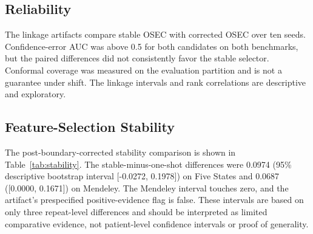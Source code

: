 \documentclass[12pt]{article}
\begin{document}
\begin{table}[t]
\centering
\caption{Mendeley nested-validation sensitivity after excluding the potentially
post-diagnostic fluoroscopy-derived predictor. Entries are fold-mean ROC-AUC
$\pm$ fold standard deviation across the same three outer folds; they are
descriptive, not patient-level confidence intervals.}
\label{tab:mendeley-validity-sensitivity}

\end{table}

\begin{table}[t]
\centering
\caption{Post-hoc AngioCAD sensitivity to the undocumented FBS unit. Predictive
bootstrap intervals condition on the 79 negative and 298 positive matched
records. OOD intervals compare source-calibration and target feature scores.}
\label{tab:angiocad-validity-sensitivity}

\end{table}



\subsection{Reliability}
The linkage artifacts compare stable OSEC with corrected OSEC over ten seeds.
Confidence-error AUC was above 0.5 for both candidates on both benchmarks, but
the paired differences did not consistently favor the stable selector.
Conformal coverage was measured on the evaluation partition and is not a
guarantee under shift. The linkage intervals and rank correlations are
descriptive and exploratory.

\begin{table}[t]
\centering
\caption{Ten-seed internal selective-reliability summaries from the
post-boundary-corrected linkage artifacts. Paired differences and descriptive
bootstrap intervals are reported in Table~\ref{tab:linkage}; these are not
independent external-validation estimates.}
\label{tab:uncertainty}

\end{table}

\subsection{Feature-Selection Stability}
The post-boundary-corrected stability comparison is shown in
Table~\ref{tab:stability}. The stable-minus-one-shot differences were 0.0974
(95\% descriptive bootstrap interval [-0.0272, 0.1978]) on Five States and
0.0687 ([0.0000, 0.1671]) on Mendeley. The Mendeley interval touches zero,
and the artifact's prespecified positive-evidence flag is false. These
intervals are based on only three repeat-level differences and should be
interpreted as limited comparative evidence, not patient-level confidence
intervals or proof of generality.
\end{document}
